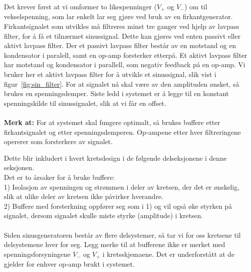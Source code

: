 \documentclass[a4paper,11pt,norsk]{article}
\begin{document}
Det krever først at vi omformer to likespenninger ($V_+$ og $V_-$) om til vekselspenning, som lar enkelt lar seg gjøre ved bruk av en firkantgenerator. Firkantsignalet som utvikles må filtreres minst tre ganger ved hjelp av lavpass filter, for å få et tilnærmet sinussignal. Dette kan gjøres ved enten passivt eller aktivt lavpass filter.
Der et passivt lavpass filter består av en motstand og en kondensator i paralell, samt en op-amp forsterker etterpå.
Et aktivt lavpass filter har motstand og kondensator i parallell, som negativ feedback på en op-amp. Vi bruker her et aktivt lavpass filter for å utvikle et sinussignal, slik vist i  figur~\ref{fig:sin_filter}.
For at signalet nå skal være av den amplituden ønsket, så brukes en spenningsdemper. Siste ledd i systemet er å legge til en konstant spenningskilde til sinussignalet, slik at vi får en offset.
\\\\
\textbf{Merk at:} For at systemet skal fungere optimalt, så brukes buffere etter firkantsignalet og etter spenningsdemperen. Op-ampene etter hver filtreringene opererer som forsterkere av signalet.

Dette blir inkludert i hvert kretsdesign i de følgende delseksjonene i denne seksjonen. \\
Det er to årsaker for å bruke buffere: \\
1) Isolasjon av spenningen og strømmen i deler av kretsen, der det er ønskelig, slik at ulike deler av kretsen ikke påvirker hverandre. \\
2) Buffere med forsterkning oppfører seg som i 1) og vil også øke styrken på signalet, dersom signalet skulle miste styrke (amplitude) i kretsen.\\\\

\label{sec:prinsipielllosning}
Siden sinusgeneratoren består av flere delsystemer, så tar vi for oss kretsene til delsystemene hver for seg. Legg merke til at bufferene ikke er merket med spenningsforsyningene $V_-$ og $V_+$ i kretsskjemaene. Det er underforstått at de gjelder for enhver op-amp brukt i systemet.
\newpage
\end{document}
